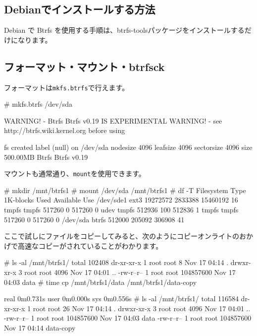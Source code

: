 \documentclass[mingoth,a4paper]{jsarticle}
\begin{document}
\subsection{Debianでインストールする方法}
Debian で Btrfs を使用する手順は、btrfs-toolsパッケージをインストールするだけになります。

\subsection{フォーマット・マウント・btrfsck}

フォーマットは\texttt{mkfs.btrfs}で行えます。
\begin{commandline}
# mkfs.btrfs /dev/sda

WARNING! - Btrfs Btrfs v0.19 IS EXPERIMENTAL
WARNING! - see http://btrfs.wiki.kernel.org before using

fs created label (null) on /dev/sda
        nodesize 4096 leafsize 4096 sectorsize 4096 size 500.00MB
Btrfs Btrfs v0.19
\end{commandline}

マウントも通常通り、\texttt{mount}を使用できます。
\begin{commandline}
# mkdir /mnt/btrfs1
# mount /dev/sda /mnt/btrfs1
# df -T
Filesystem    Type   1K-blocks      Used Available Use%
/dev/sde1     ext3    19272572   2833388  15460192  16%
tmpfs        tmpfs      517260         0    517260   0%
udev         tmpfs      512936       100    512836   1%
tmpfs        tmpfs      517260         0    517260   0%
/dev/sda     btrfs      512000    205092    306908  41%
\end{commandline}

ここで試しにファイルをコピーしてみると、次のようにコピーオンライトのおかげで高速なコピーがされていることがわかります。
\begin{commandline}
# ls -al /mnt/btrfs1/
total 102408
dr-xr-xr-x 1 root root         8 Nov 17 04:14 .
drwxr-xr-x 3 root root      4096 Nov 17 04:01 ..
-rw-r--r-- 1 root root 104857600 Nov 17 04:03 data
# time cp /mnt/btrfs1/data  /mnt/btrfs1/data-copy

real    0m0.731s
user    0m0.000s
sys     0m0.556s
# ls -al /mnt/btrfs1/
total 116584
dr-xr-xr-x 1 root root        26 Nov 17 04:14 .
drwxr-xr-x 3 root root      4096 Nov 17 04:01 ..
-rw-r--r-- 1 root root 104857600 Nov 17 04:03 data
-rw-r--r-- 1 root root 104857600 Nov 17 04:14 data-copy
\end{commandline}
\end{document}
